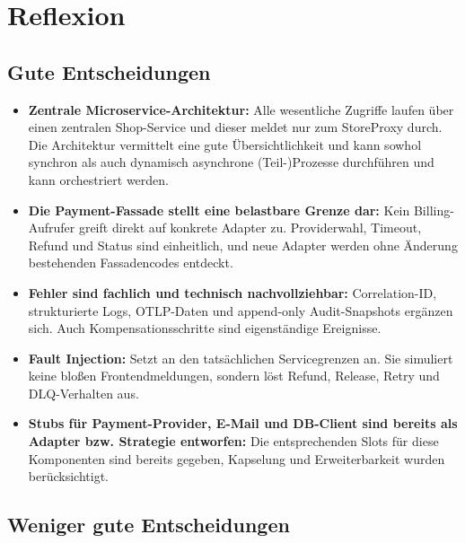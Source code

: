 \documentclass[10pt,a4paper]{article}
\newcommand{\littleGap}{\vspace{8mm}}
\newcommand{\midGap}{\vspace{12mm}}
\newcommand{\term}[1]{\textsf{\textbf{#1}}}
\begin{document}
\midGap

\newpage

\section{Reflexion}
\label{sec:reflection}

\littleGap

\subsection{Gute Entscheidungen}

\begin{itemize}  
	\item \term{Zentrale Microservice-Architektur:}
    Alle wesentliche Zugriffe laufen über einen zentralen Shop-Service und dieser
		meldet nur zum StoreProxy durch. Die Architektur vermittelt eine gute Übersichtlichkeit
		und kann sowhol synchron als auch dynamisch asynchrone (Teil-)Prozesse durchführen und
		kann orchestriert werden.
  \item \term{Die Payment-Fassade stellt eine belastbare Grenze dar:}
    Kein Billing-Aufrufer greift direkt auf konkrete Adapter zu. Providerwahl,
    Timeout, Refund und Status sind einheitlich, und neue Adapter werden ohne
    Änderung bestehenden Fassadencodes entdeckt.
  \item \term{Fehler sind fachlich und technisch nachvollziehbar:}
    Correlation-ID, strukturierte Logs, OTLP-Daten und append-only
    Audit-Snapshots ergänzen sich. Auch Kompensationsschritte sind
    eigenständige Ereignisse.
  \item \term{Fault Injection:}
    Setzt an den tatsächlichen Servicegrenzen an. Sie
    simuliert keine bloßen Frontendmeldungen, sondern löst Refund, Release,
    Retry und DLQ-Verhalten aus.
  \item \term{Stubs für Payment-Provider, E-Mail und DB-Client sind bereits als Adapter bzw. Strategie entworfen:}
    Die entsprechenden Slots für diese Komponenten sind bereits gegeben, Kapselung und Erweiterbarkeit wurden berücksichtigt.
\end{itemize}

\midGap

\subsection{Weniger gute Entscheidungen}
\end{document}
